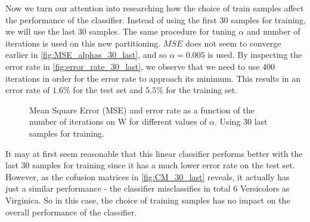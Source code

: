 \documentclass{article}
\begin{document}
Now we turn our attention into researching how the choice of train samples affect the performance of
the classifier. Instead of using the first 30 samples for training, we will use the last 30 samples.
The same procedure for tuning $\alpha$ and number of iterations is used on this new partitioning.
$MSE$ does not seem to converge earlier in \autoref{fig:MSE_alphas_30_last}, and so
$\alpha = 0.005$ is used. By inspecting the error rate in \autoref{fig:error_rate_30_last}, we observe that we
need to use 400 iterations in order for the error rate to approach its minimum. This results in an error rate of
$1.6\%$ for the test set and $5.5\%$ for the training set.

\begin{figure}
    \centering
    \caption{Mean Square Error (MSE) and error rate as a function of the number of iterations on W
    for different values of $\alpha$. Using 30 last samples for training.}
\end{figure}

It may at first seem reasonable that this linear classifier performs better with the last 30 samples for training
since it  has a much lower error rate on the test set. However, as the cofusion matrices in \autoref{fig:CM_30_last}
reveals, it actually has just a similar performance - the classifier misclassifies in total 6 Versicolors as
Virginica. So in this case, the choice of training samples has no impact on the overall performance of the
classifier.
\end{document}

